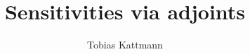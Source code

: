 \documentclass[10pt]{article}
\begin{document}
\title{Sensitivities via adjoints}
\author{Tobias Kattmann}
\maketitle
\tableofcontents



\printbibliography[heading=bibintoc]
\end{document}
